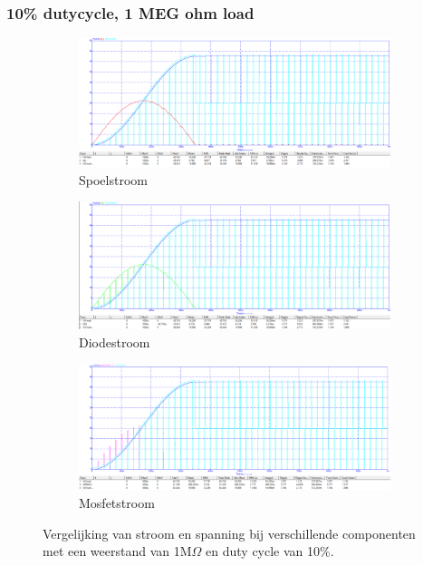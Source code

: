 \subsubsection{10\% dutycycle, 1 MEG ohm load}
\begin{figure}[h!]
    \centering
    \begin{subfigure}[b]{0.3\linewidth}
        \centering
        \includegraphics[width=\linewidth]{img/hfd1/hfd1-10pduty-1MEG-INDUCTOR.png}
        \caption{Spoelstroom}
        \label{fig:inductor}
    \end{subfigure}
    \hfill
    \begin{subfigure}[b]{0.3\linewidth}
        \centering
        \includegraphics[width=\linewidth]{img/hfd1/hfd1-10pduty-1MEG-DIODE.png}
        \caption{Diodestroom}
        \label{fig:diode}
    \end{subfigure}
    \hfill
    \begin{subfigure}[b]{0.3\linewidth}
        \centering
        \includegraphics[width=\linewidth]{img/hfd1/hfd1-10pduty-1MEG-DMOSFET.png}
        \caption{Mosfetstroom}
        \label{fig:mosfet}
    \end{subfigure}
    
    \caption{Vergelijking van stroom en spanning bij verschillende componenten met een weerstand van 1M\(\Omega\) en duty cycle van 10\%.}
    \label{fig:componenten}
\end{figure}




